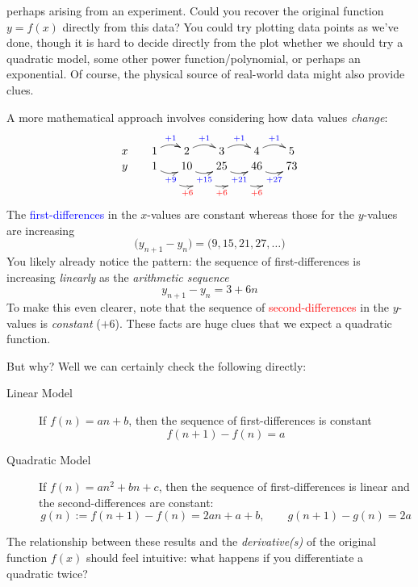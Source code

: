 perhaps arising from an experiment. Could you recover the original function $y=f(x)$ directly from this data? You could try plotting data points as we've done, though it is hard to decide directly from the plot whether we should try a quadratic model, some other power function/polynomial, or perhaps an exponential. Of course, the physical source of real-world data might also provide clues.
\medbreak

A more mathematical approach involves considering how data values \emph{change}:
\[
	\xymatrix @R0pt @C15pt{
		x & 1 \ar@/^/[r]^{\textcolor{blue}{+1}} & 2 \ar@/^/[r]^{\textcolor{blue}{+1}} & 3 \ar@/^/[r]^{\textcolor{blue}{+1}} & 4 \ar@/^/[r]^{\textcolor{blue}{+1}} & 5\\
		y & 1 \ar@/_/[r]_{\textcolor{blue}{+9}}="a" & 10 \ar@/_/[r]_{\textcolor{blue}{+15}}="b" & 25 \ar@/_/[r]_{\textcolor{blue}{+21}}="c" & 46 \ar@/_/[r]_{\textcolor{blue}{+27}}="d" & 73
		\ar @/_/_{\textcolor{red}{+6}} "a";"b" \ar @/_/_{\textcolor{red}{+6}} "b";"c" \ar @/_/_{\textcolor{red}{+6}} "c";"d"
	}
\]
The \textcolor{blue}{first-differences} in the $x$-values are constant whereas those for the $y$-values are increasing
\[
	\bigl(y_{n+1}-y_n\bigr)=\bigl(9,15,21,27,\ldots\bigr)
\]
You likely already notice the pattern: the sequence of first-differences is increasing \emph{linearly} as the \emph{arithmetic sequence}
\[
	y_{n+1}-y_n=3+6n
\]
To make this even clearer, note that the sequence of \textcolor{red}{second-differences} in the $y$-values is \emph{constant} ($+6$). These facts are huge clues that we expect a quadratic function.

\goodbreak

But why? Well we can certainly check the following directly: 
\begin{description}
  \item[Linear Model] If $f(n)=an+b$, then the sequence of first-differences is constant
  \[
  	f(n+1)-f(n)=a
  \]
  \item[Quadratic Model] If $f(n)=an^2+bn+c$, then the sequence of first-differences is linear and the second-differences are constant:
  \[
  	g(n):=f(n+1)-f(n)=2an+a+b,\qquad g(n+1)-g(n)=2a
  \]
\end{description}
  
The relationship between these results and the \emph{derivative(s)} of the original function $f(x)$ should feel intuitive: what happens if you differentiate a quadratic twice?

